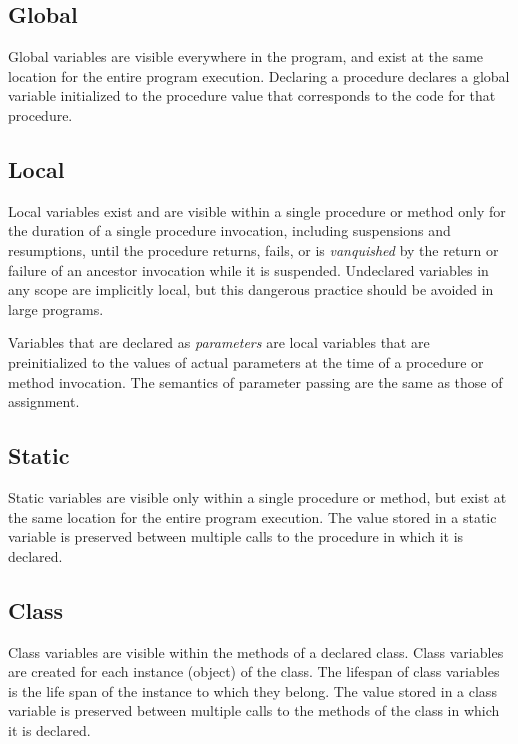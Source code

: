 \subsection*{Global}

Global variables are visible everywhere in the program, and exist at the same
location for the entire program execution. Declaring a procedure declares a
global variable initialized to the procedure value that corresponds to the
code for that procedure.

\subsection*{Local}

Local variables exist and are visible within a single procedure or method only
for the duration of a single procedure invocation, including suspensions and
resumptions, until the procedure returns, fails, or is \textit{vanquished} by
the return or failure of an ancestor invocation while it is suspended.
Undeclared variables in any scope are implicitly local, but this
dangerous practice should be avoided in large programs.

Variables that are declared as \textit{parameters} are local variables
that are preinitialized to the values of actual parameters at the time
of a procedure or method invocation. The semantics of parameter passing
are the same as those of assignment.

\subsection*{Static}

Static variables are visible only within a single procedure or method, but exist
at the same location for the entire program execution. The value stored in a
static variable is preserved between multiple calls to the procedure in which it
is declared.

\subsection*{Class}

Class variables are visible within the methods of a declared class.  Class
variables are created for each instance (object) of the
class. The lifespan of class variables is the life span of the instance to which
they belong. The value stored in a class variable is preserved between multiple
calls to the methods of the class in which it is declared.

